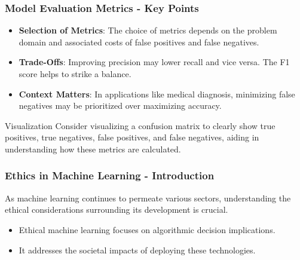 \documentclass{beamer}
\begin{document}
\begin{frame}[fragile]
    \frametitle{Model Evaluation Metrics - Key Points}
    \begin{itemize}
        \item \textbf{Selection of Metrics}: The choice of metrics depends on the problem domain and associated costs of false positives and false negatives.
        \item \textbf{Trade-Offs}: Improving precision may lower recall and vice versa. The F1 score helps to strike a balance.
        \item \textbf{Context Matters}: In applications like medical diagnosis, minimizing false negatives may be prioritized over maximizing accuracy.
    \end{itemize}

    \begin{block}{Visualization}
        Consider visualizing a confusion matrix to clearly show true positives, true negatives, false positives, and false negatives, aiding in understanding how these metrics are calculated.
    \end{block}
\end{frame}

\begin{frame}[fragile]
    \frametitle{Ethics in Machine Learning - Introduction}
    As machine learning continues to permeate various sectors, understanding the ethical considerations surrounding its development is crucial. 
    \begin{itemize}
        \item Ethical machine learning focuses on algorithmic decision implications.
        \item It addresses the societal impacts of deploying these technologies.
    \end{itemize}
\end{frame}
\end{document}
